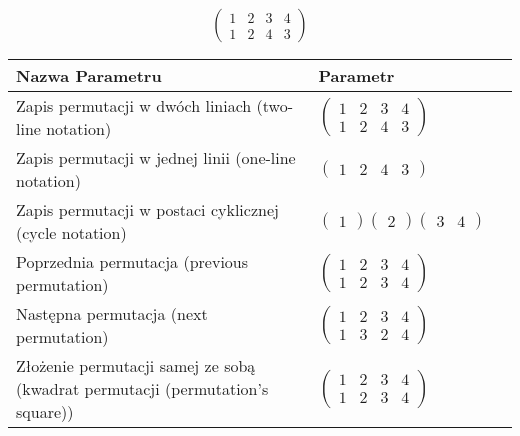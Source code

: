 \documentclass[12pt]{article}
\begin{document}
\subsection{}
\begin{center}
\[
\begin{pmatrix}
	1 & 2 & 3 & 4 \\ 
	1 & 2 & 4 & 3 
\end{pmatrix}
\]

\begin{tabular}{|m{0.6\linewidth}|m{0.4\linewidth}|}
	\hline
	Nazwa Parametru & Parametr \\
	\hline
	Zapis permutacji w dwóch liniach (two-line notation) & $\begin{pmatrix} 1 & 2 & 3 & 4 \\ 
1 & 2 & 4 & 3 \end{pmatrix}$ \\ 
	\hline
	Zapis permutacji w jednej linii (one-line notation) & $\begin{pmatrix} 1 & 2 & 4 & 3 \end{pmatrix}$ \\ 
	\hline
	Zapis permutacji w postaci cyklicznej (cycle notation) & $\begin{pmatrix} 1 \end{pmatrix} \begin{pmatrix} 2 \end{pmatrix} \begin{pmatrix} 3 & 4 \end{pmatrix} $ \\ 
	\hline
	Poprzednia permutacja (previous permutation) & $\begin{pmatrix} 1 & 2 & 3 & 4 \\ 
1 & 2 & 3 & 4 \end{pmatrix}$ \\ 
	\hline
	Następna permutacja (next permutation) & $\begin{pmatrix} 1 & 2 & 3 & 4 \\ 
1 & 3 & 2 & 4 \end{pmatrix}$ \\ 
	\hline
	Złożenie permutacji samej ze sobą (kwadrat permutacji (permutation's square)) & $\begin{pmatrix} 1 & 2 & 3 & 4 \\ 
1 & 2 & 3 & 4 \end{pmatrix}$ \\ 
	\hline
\end{tabular}
\end{center}
\end{document}
